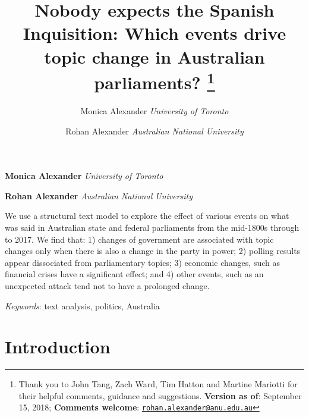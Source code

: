 \documentclass[12pt,]{article}
\title{Nobody expects the Spanish Inquisition: Which events drive topic change
in Australian parliaments? \thanks{Thank you to John Tang, Zach Ward, Tim Hatton and Martine Mariotti for
their helpful comments, guidance and suggestions. \textbf{Version as
of}: September 15, 2018; \textbf{Comments welcome}:
\href{mailto:rohan.alexander@anu.edu.au}{\nolinkurl{rohan.alexander@anu.edu.au}}}  }
\author{\Large Monica Alexander\vspace{0.05in} \newline\normalsize\emph{University of Toronto}   \and \Large Rohan Alexander\vspace{0.05in} \newline\normalsize\emph{Australian National University}  }
\date{}
\newcommand*{\authorfont}{\fontfamily{phv}\selectfont}
\renewenvironment{abstract}
 {{%
    \setlength{\leftmargin}{0mm}
    \setlength{\rightmargin}{\leftmargin}%
  }%
  \relax}
 {\endlist}
\begin{document}
	
%

{%
\setlength{\parindent}{0pt}
\thispagestyle{plain}
{\fontsize{18}{20}\selectfont\raggedright 
\maketitle  %

}

{
   \vskip 13.5pt\relax \normalsize\fontsize{11}{12} 
\textbf{\authorfont Monica Alexander} \hskip 15pt \emph{\small University of Toronto}   \par \textbf{\authorfont Rohan Alexander} \hskip 15pt \emph{\small Australian National University}   

}

}








\begin{abstract}

    \hbox{\vrule height .2pt width 39.14pc}

    \vskip 8.5pt %

\noindent We use a structural text model to explore the effect of various events
on what was said in Australian state and federal parliaments from the
mid-1800s through to 2017. We find that: 1) changes of government are
associated with topic changes only when there is also a change in the
party in power; 2) polling results appear dissociated from parliamentary
topics; 3) economic changes, such as financial crises have a significant
effect; and 4) other events, such as an unexpected attack tend not to
have a prolonged change.


\vskip 8.5pt \noindent \emph{Keywords}: text analysis, politics, Australia \par

    \hbox{\vrule height .2pt width 39.14pc}



\end{abstract}


\vskip 6.5pt


\noindent  \section{Introduction}\label{introduction}
\end{document}
